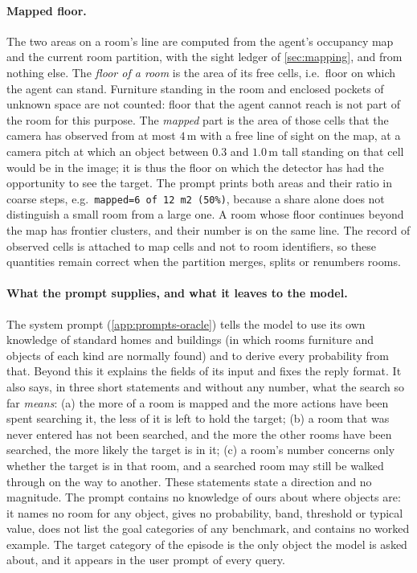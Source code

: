 \documentclass[10pt]{article}
\newcommand{\code}[1]{\texttt{#1}}
\newcommand{\m}{\,\mathrm{m}}
\begin{document}
\paragraph{Mapped floor.} The two areas on a room's line are computed from the
agent's occupancy map and the current room partition, with the sight ledger of
\cref{sec:mapping}, and from nothing else.
The \emph{floor of a room} is the area of its free cells, i.e.\ floor on which
the agent can stand. Furniture standing in the room and enclosed pockets of
unknown space are not counted: floor that the agent cannot reach is not part of
the room for this purpose. The \emph{mapped} part is the area of those cells
that the camera has observed from at most $4\m$ with a free line of sight on
the map, at a camera pitch at which an object between $0.3$ and $1.0\m$ tall
standing on that cell would be in the image; it is thus the floor on which the
detector has had the opportunity to see the target. The prompt prints both
areas and their ratio in coarse steps, e.g.\ \code{mapped=6 of 12 m2 (50\%)},
because a share alone does not distinguish a small room from a large one. A
room whose floor continues beyond the map has frontier clusters,
and their number is on the same line. The record of observed cells is attached
to map cells and not to room identifiers, so these quantities remain correct
when the partition merges, splits or renumbers rooms.

\paragraph{What the prompt supplies, and what it leaves to the model.} The
system prompt (\cref{app:prompts-oracle}) tells the model to use its own
knowledge of standard homes and buildings (in which rooms furniture and
objects of each kind are normally found) and to derive every probability from
that. Beyond this it explains the fields of its input and fixes the reply
format. It also says, in three short
statements and without any number, what the search so far \emph{means}:
(a) the more of a room is mapped and the more actions have been spent
searching it, the less of it is left to hold the target;
(b) a room that was never entered has not been searched, and the more the
other rooms have been searched, the more likely the target is in it;
(c) a room's number concerns only whether the target is in that room, and a
searched room may still be walked through on the way to another.
These statements state a direction and no magnitude. The prompt contains no
knowledge of ours
about where objects are: it names no room for any object, gives no
probability, band, threshold or typical value, does not list the goal
categories of any benchmark, and contains no worked example. The target
category of the episode is the only object the model is asked about, and it
appears in the user prompt of every query.
\end{document}
